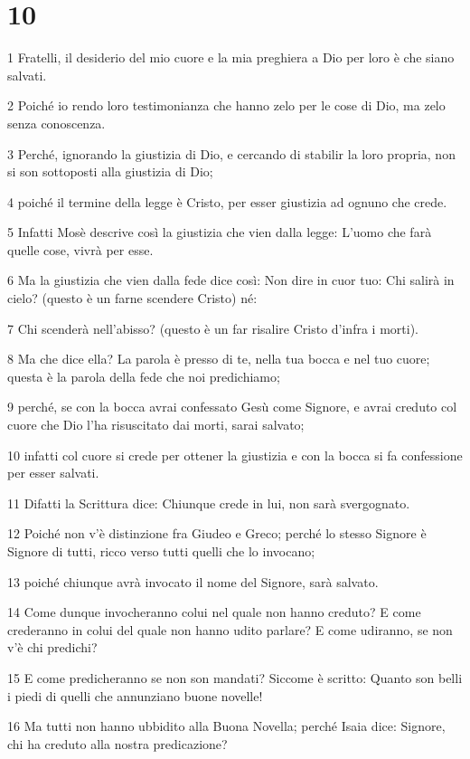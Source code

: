 \chapter{10}

\par 1 Fratelli, il desiderio del mio cuore e la mia preghiera a Dio per loro è che siano salvati.
\par 2 Poiché io rendo loro testimonianza che hanno zelo per le cose di Dio, ma zelo senza conoscenza.
\par 3 Perché, ignorando la giustizia di Dio, e cercando di stabilir la loro propria, non si son sottoposti alla giustizia di Dio;
\par 4 poiché il termine della legge è Cristo, per esser giustizia ad ognuno che crede.
\par 5 Infatti Mosè descrive così la giustizia che vien dalla legge: L'uomo che farà quelle cose, vivrà per esse.
\par 6 Ma la giustizia che vien dalla fede dice così: Non dire in cuor tuo: Chi salirà in cielo? (questo è un farne scendere Cristo) né:
\par 7 Chi scenderà nell'abisso? (questo è un far risalire Cristo d'infra i morti).
\par 8 Ma che dice ella? La parola è presso di te, nella tua bocca e nel tuo cuore; questa è la parola della fede che noi predichiamo;
\par 9 perché, se con la bocca avrai confessato Gesù come Signore, e avrai creduto col cuore che Dio l'ha risuscitato dai morti, sarai salvato;
\par 10 infatti col cuore si crede per ottener la giustizia e con la bocca si fa confessione per esser salvati.
\par 11 Difatti la Scrittura dice: Chiunque crede in lui, non sarà svergognato.
\par 12 Poiché non v'è distinzione fra Giudeo e Greco; perché lo stesso Signore è Signore di tutti, ricco verso tutti quelli che lo invocano;
\par 13 poiché chiunque avrà invocato il nome del Signore, sarà salvato.
\par 14 Come dunque invocheranno colui nel quale non hanno creduto? E come crederanno in colui del quale non hanno udito parlare? E come udiranno, se non v'è chi predichi?
\par 15 E come predicheranno se non son mandati? Siccome è scritto: Quanto son belli i piedi di quelli che annunziano buone novelle!
\par 16 Ma tutti non hanno ubbidito alla Buona Novella; perché Isaia dice: Signore, chi ha creduto alla nostra predicazione?
